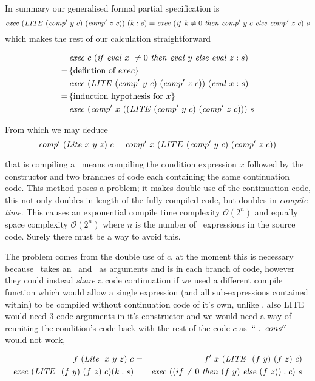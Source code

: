 \documentclass {article}
\begin{document}
In summary our generalised formal partial specification is
\begin{equation*}
	\Exec (\LITE (\Compp  y\ c)\ (\Compp  z\ c) )\ (k:s) 
= \Exec (\ifff k \not= 0\ \tthen \Compp  y\ c\ \eelse \Compp  z\ c)\ s 
\end{equation*}
which makes the rest of our calculation straightforward

\begin{align*}
	&\mathit{exec\ } c\ (\mathit{if\ } \mathit{eval\ }  x\ \not= 0\ \mathit{then\ } \mathit{eval\ }  y\ \mathit{else\ } \mathit{eval\ }  z : s) \\
	=\, & \{\mbox{defintion of}\ exec\} \\
	&\mathit{exec\ } (\mathit{LITE\ } (\mathit{comp'\ }  y\ c)\ (\mathit{comp'\ }  z\ c) )\ (\mathit{eval\ }  x : s) \\
	=\, & \{\mbox{induction hypothesis for}\ x\} \\
	&\mathit{exec\ } (\mathit{comp'\ }  x\ ((\mathit{LITE\ } (\mathit{comp'\ }  y\ c)\ (\mathit{comp'\ }  z\ c)))\ s
\end{align*}

From which we may deduce 
\[ \Compp  (Lite\ x\ y\ z)\ c 
		= \Compp  x\ (LITE\ (\Compp  y\ c)\ (\Compp  z\ c)) \]
		
\noindent that is compiling a \lite\ 
means compiling the condition expression $x$
followed by the \LITEt constructor and two
branches of code each containing the same
continuation code.
This method poses a problem;
it makes double use of the continuation code,
this not only doubles in length of the fully compiled code,
but doubles in \emph{compile time}.
This causes an exponential
 compile time complexity 
\( \mathcal{O}(2^n) \)
and equally space complexity
\( \mathcal{O}(2^n) \)
where $n$ is the number of \lite\ expressions 
in the source code.
Surely there must be a way to avoid this.

The problem comes from the double use of $c$,
at the moment this is necessary because \compp\
takes an \expr\ and \code\ as arguments and is in
each branch of code,
however they could instead \emph{share}
a code continuation if we used a different compile function
which would allow a single expression 
(and all sub-expressions contained within)  
to be compiled without continuation code of it's own,
unlike \compp, also LITE would need 3 code arguments in
it's constructor and we would need a way of 
reuniting the condition's code back with the rest of the code $c$
as~$``:\ cons''$ would not work,

\begin{eqnarray*}
f\ (\mathit{Lite\ }\ x\ y\ z)\ c &=& f'\ x\ (\mathit{LITE\ }\ (f\ y)\ (f\ z)\ c) \\
\mathit{exec\ } (\mathit{LITE\ }\ (f\ y)\ (f\ z)\ c) (k : s) 
&=& \mathit{exec\ } ((if \not=0\ \mathit{then\ } (f\ y)\ \mathit{else\ } (f\ z)) : c)\ s 
\end{eqnarray*}
\end{document}
